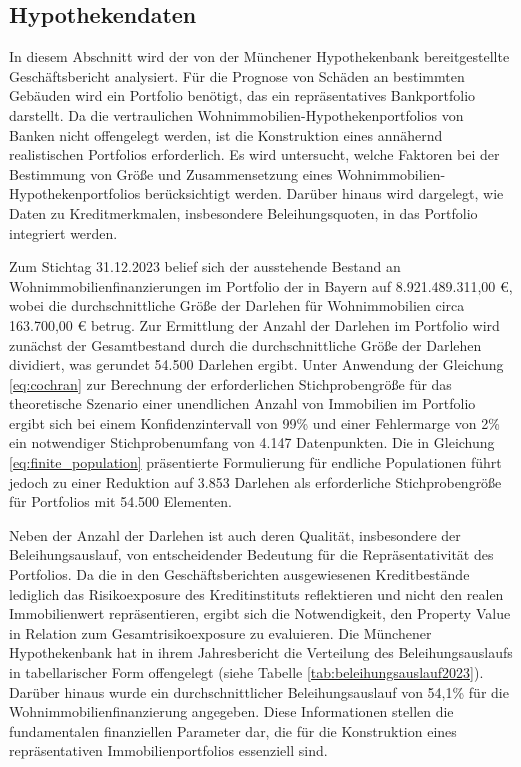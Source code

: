 \subsection{Hypothekendaten}
In diesem Abschnitt wird der von der Münchener Hypothekenbank bereitgestellte Geschäftsbericht analysiert. Für die Prognose von Schäden an bestimmten Gebäuden wird ein Portfolio benötigt, das ein repräsentatives Bankportfolio darstellt. Da die vertraulichen Wohnimmobilien-Hypothekenportfolios von Banken nicht offengelegt werden, ist die Konstruktion eines annähernd realistischen Portfolios erforderlich. Es wird untersucht, welche Faktoren bei der Bestimmung von Größe und Zusammensetzung eines Wohnimmobilien-Hypothekenportfolios berücksichtigt werden. Darüber hinaus wird dargelegt, wie Daten zu Kreditmerkmalen, insbesondere Beleihungsquoten, in das Portfolio integriert werden.

Zum Stichtag 31.12.2023 belief sich der ausstehende Bestand an Wohnimmobilienfinanzierungen im Portfolio der \textcite{MuenchenerHyp2023} in Bayern auf 8.921.489.311,00 €, wobei die durchschnittliche Größe der Darlehen für Wohnimmobilien circa 163.700,00 € betrug. Zur Ermittlung der Anzahl der Darlehen im Portfolio wird zunächst der Gesamtbestand durch die durchschnittliche Größe der Darlehen dividiert, was gerundet 54.500 Darlehen ergibt. Unter Anwendung der Gleichung \ref{eq:cochran} zur Berechnung der erforderlichen Stichprobengröße für das theoretische Szenario einer unendlichen Anzahl von Immobilien im Portfolio ergibt sich bei einem Konfidenzintervall von 99\% und einer Fehlermarge von 2\% ein notwendiger Stichprobenumfang von 4.147 Datenpunkten. Die in Gleichung \ref{eq:finite_population} präsentierte Formulierung für endliche Populationen führt jedoch zu einer Reduktion auf 3.853 Darlehen als erforderliche Stichprobengröße für Portfolios mit 54.500 Elementen.

Neben der Anzahl der Darlehen ist auch deren Qualität, insbesondere der Beleihungsauslauf, von entscheidender Bedeutung für die Repräsentativität des Portfolios. Da die in den Geschäftsberichten ausgewiesenen Kreditbestände lediglich das Risikoexposure des Kreditinstituts reflektieren und nicht den realen Immobilienwert repräsentieren, ergibt sich die Notwendigkeit, den Property Value in Relation zum Gesamtrisikoexposure zu evaluieren. Die Münchener Hypothekenbank hat in ihrem Jahresbericht die Verteilung des Beleihungsauslaufs in tabellarischer Form offengelegt (siehe Tabelle \ref{tab:beleihungsauslauf2023}). Darüber hinaus wurde ein durchschnittlicher Beleihungsauslauf von 54,1\% für die Wohnimmobilienfinanzierung angegeben. Diese Informationen stellen die fundamentalen finanziellen Parameter dar, die für die Konstruktion eines repräsentativen Immobilienportfolios essenziell sind.

